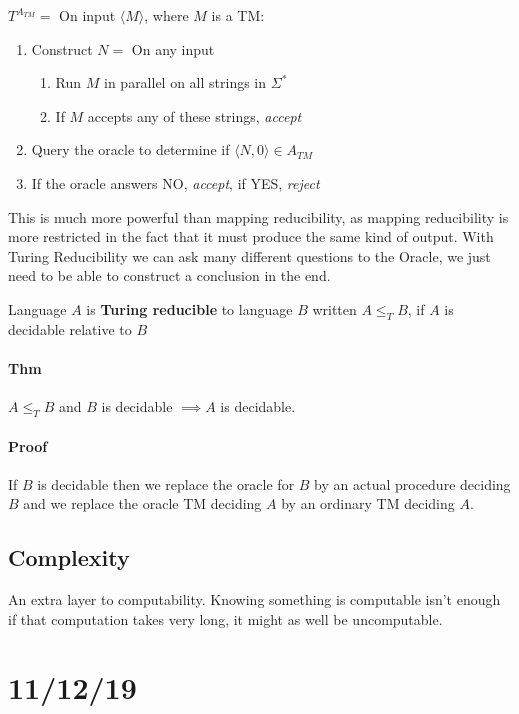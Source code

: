 \documentclass[12 pt]{article}
\begin{document}
$T^{A_{TM}} =  $ On input $\langle M \rangle$, where $M$ is a TM:
\begin{enumerate}
\item Construct $N =$ On any input
  \begin{enumerate}
  \item Run $M$ in parallel on all strings in $\Sigma^*$
  \item If $M$ accepts any of these strings, \textit{accept}
  \end{enumerate}
\item Query the oracle to determine if $\langle N, 0 \rangle \in
  A_{TM}$
\item If the oracle answers NO, \textit{accept}, if YES, \textit{reject}
\end{enumerate}
This is much more powerful than mapping reducibility, as mapping
reducibility is more restricted in the fact that it must produce the
same kind of output. With Turing Reducibility we can ask many
different questions to the Oracle, we just need to be able to
construct a conclusion in the end.

Language $A$ is \textbf{Turing reducible} to language $B$ written
$A \leq_T B$, if $A$ is decidable relative to $B$
\paragraph{Thm} $A \leq_T B$ and $B$ is decidable $\implies A$ is
decidable.
\paragraph{Proof} If $B$ is decidable then we replace the oracle for
$B$ by an actual procedure deciding $B$ and we replace the oracle TM
deciding $A$ by an ordinary TM deciding $A$.
\subsection{Complexity}
An extra layer to computability. Knowing something is computable isn't
enough if that computation takes very long, it might as well be
uncomputable.
\section{11/12/19}
\end{document}
